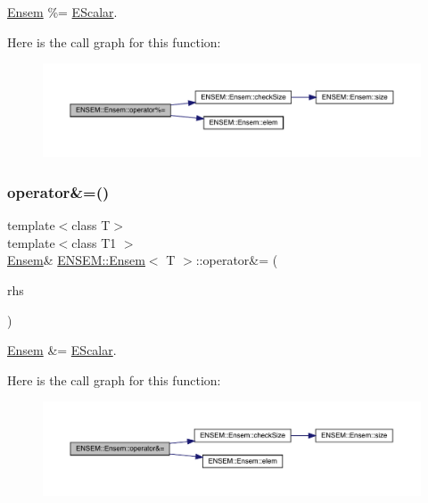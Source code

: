 \mbox{\hyperlink{classENSEM_1_1Ensem}{Ensem}} \%= \mbox{\hyperlink{classENSEM_1_1EScalar}{E\+Scalar}}. 

Here is the call graph for this function\+:
\nopagebreak
\begin{figure}[H]
\begin{center}
\leavevmode
\includegraphics[width=350pt]{d7/d3e/classENSEM_1_1Ensem_a8f910ad50fa1625b535bd2456aa7ad64_cgraph}
\end{center}
\end{figure}
\mbox{\label{classENSEM_1_1Ensem_ab5e9900522968210e53ec66b09a402fe}} 
\subsubsection{\texorpdfstring{operator\&=()}{operator\&=()}\hspace{0.1cm}{\footnotesize\ttfamily [1/3]}}
{\footnotesize\ttfamily template$<$class T$>$ \\
template$<$class T1 $>$ \\
\mbox{\hyperlink{classENSEM_1_1Ensem}{Ensem}}\& \mbox{\hyperlink{classENSEM_1_1Ensem}{E\+N\+S\+E\+M\+::\+Ensem}}$<$ T $>$\+::operator\&= (\begin{DoxyParamCaption}\item[{const \mbox{\hyperlink{classENSEM_1_1EScalar}{E\+Scalar}}$<$ T1 $>$ \&}]{rhs }\end{DoxyParamCaption})\hspace{0.3cm}{\ttfamily [inline]}}



\mbox{\hyperlink{classENSEM_1_1Ensem}{Ensem}} \&= \mbox{\hyperlink{classENSEM_1_1EScalar}{E\+Scalar}}. 

Here is the call graph for this function\+:
\nopagebreak
\begin{figure}[H]
\begin{center}
\leavevmode
\includegraphics[width=350pt]{d7/d3e/classENSEM_1_1Ensem_ab5e9900522968210e53ec66b09a402fe_cgraph}
\end{center}
\end{figure}
\mbox{\label{classENSEM_1_1Ensem_ab5e9900522968210e53ec66b09a402fe}} 
